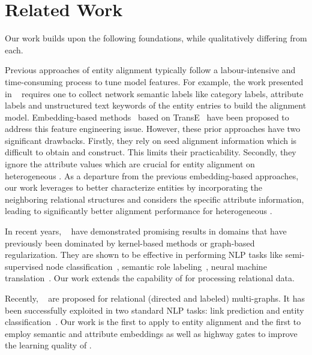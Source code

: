 
	
	\section{Related Work}
    Our work builds upon the following foundations, while qualitatively differing from each.

    	 Previous approaches of entity alignment typically
follow a labour-intensive and time-consuming process to tune model features. For example, the work presented in ~\cite{Wang2017} requires
one to collect network semantic labels like category labels, attribute labels and unstructured text keywords of the entity entries to build
the alignment model. Embedding-based methods~\cite{hao2016joint,chen2016multilingual,sun2017cross,zhu2017iterative} based on
TransE~\cite{bordes2013translating} have been proposed to address this feature engineering issue. However, these prior approaches have two
significant drawbacks. Firstly, they rely on seed alignment information which is difficult to obtain and construct. This limits their
practicability. Secondly, they ignore the attribute values which are crucial for entity alignment on heterogeneous \KGs. As a departure
from the previous embedding-based approaches, our work leverages \RGCNs to better characterize entities by incorporating the neighboring
relational structures and considers the specific attribute information, leading to significantly better alignment performance for
heterogeneous \KGs.

	 In recent years, \GCNs~\cite{Duvenaud2015Convolutional,Kearnes2016Molecular}
    have demonstrated promising results in domains that have previously been dominated by kernel-based methods or graph-based regularization.
    They are shown to be effective in performing NLP tasks like semi-supervised
    node classification~\cite{Kipf2016Semi}, semantic role labeling~\cite{Marcheggiani2017Encoding}, neural machine
    translation~\cite{Bastings2017Graph}. Our work extends the capability of \GCNs for processing relational data.


	Recently, \RGCNs~\cite{Schlichtkrull2017Modeling} are proposed for relational (directed and labeled) multi-graphs. It has been
successfully exploited in two standard NLP tasks: link prediction and entity classification~\cite{Schlichtkrull2017Modeling}. Our work is
the first to apply \RGCNs to entity alignment and the first to employ semantic and attribute embeddings as well as highway gates to improve
the learning quality of \RGCNs.

